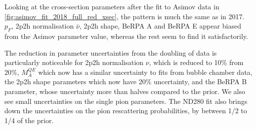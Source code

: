 Looking at the cross-section parameters after the fit to Asimov data in \autoref{fig:asimov_fit_2018_full_red_xsec}, the pattern is much the same as in 2017. $p_F$, 2p2h normalisation $\bar{\nu}$, 2p2h shape, BeRPA A and BeRPA E appear biased from the Asimov parameter value, whereas the rest seem to find it satisfactorily. 

The reduction in parameter uncertainties from the doubling of data is particularly noticeable for 2p2h normalisation $\nu$, which is reduced to 10\% from 20\%, $M_A^{QE}$ which now has a similar uncertainty to fits from bubble chamber data, the 2p2h shape parameters which now have 20\% uncertainty, and the BeRPA B parameter, whose uncertainty more than halves compared to the prior. We also see small uncertainties on the single pion parameters. The ND280 fit also brings down the uncertainties on the pion rescattering probabilities, by between 1/2 to 1/4 of the prior.


